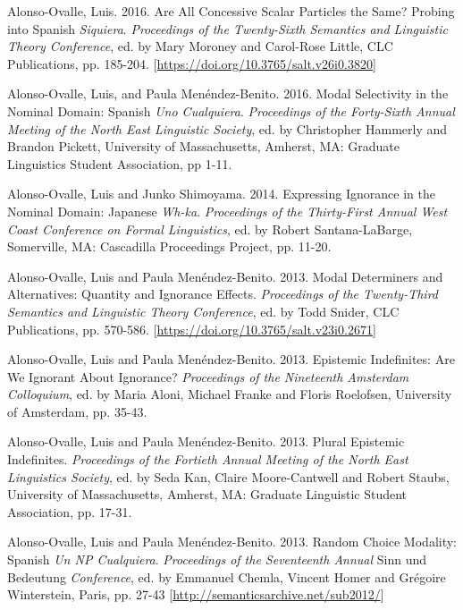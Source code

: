 \documentclass[11pt]{article}
\begin{document}
Alonso-Ovalle, Luis. 2016. Are All Concessive Scalar Particles the Same? Probing into Spanish \textit{Siquiera}.  \textit{Proceedings of the Twenty-Sixth
  Semantics and Linguistic Theory Conference}, ed. by Mary Moroney and
Carol-Rose Little, CLC Publications, pp. 185-204. {\footnotesize [\href{https://doi.org/10.3765/salt.v26i0.3820}{https://doi.org/10.3765/salt.v26i0.3820}]}

Alonso-Ovalle, Luis, and Paula Men\'endez-Benito. 2016. Modal Selectivity
in the Nominal Domain: Spanish \textit{Uno Cualquiera}. \textit{Proceedings
of the Forty-Sixth Annual Meeting of the North East Linguistic Society},
ed. by Christopher Hammerly and Brandon Pickett, University of Massachusetts, Amherst, MA: Graduate Linguistics Student Association, pp 1-11.

Alonso-Ovalle, Luis and Junko Shimoyama. 2014. Expressing Ignorance
in the Nominal Domain: Japanese \textit{Wh-ka}. \textit{Proceedings of
  the Thirty-First Annual West Coast Conference on Formal Linguistics}, ed. by Robert
Santana-LaBarge, Somerville, MA: Cascadilla Proceedings Project, pp. 11-20.

Alonso-Ovalle, Luis and Paula
Men\'endez-Benito. 2013. Modal Determiners and Alternatives:
Quantity and Ignorance Effects.  \textit{Proceedings of the Twenty-Third
  Semantics and Linguistic Theory Conference}, ed. by Todd Snider, CLC
Publications, pp. 570-586. {\footnotesize [\href{https://doi.org/10.3765/salt.v23i0.2671}{https://doi.org/10.3765/salt.v23i0.2671}]}

Alonso-Ovalle, Luis and Paula
Men\'endez-Benito. 2013. Epistemic Indefinites: Are We Ignorant About
Ignorance? \textit{Proceedings of the Nineteenth Amsterdam Colloquium},
ed. by Maria Aloni, Michael Franke and Floris Roelofsen, University of
Amsterdam, pp. 35-43.

Alonso-Ovalle, Luis and Paula
Men\'endez-Benito. 2013. Plural Epistemic
  Indefinites.  \textit{Proceedings of the Fortieth Annual Meeting of the North East Linguistics
    Society}, ed. by Seda Kan, Claire Moore-Cantwell and Robert
  Staubs, University of Massachusetts, Amherst, MA: Graduate Linguistic Student Association, pp. 17-31.

Alonso-Ovalle, Luis and Paula Men\'endez-Benito. 2013. Random
Choice Modality: Spanish \textit{Un {\em NP}
  Cualquiera}. \textit{Proceedings of the Seventeenth Annual} Sinn und Bedeutung \textit{Conference}, ed. by
Emmanuel Chemla, Vincent Homer and Gr\'egoire Winterstein, Paris, pp. 27-43 {\footnotesize [\href{http://semanticsarchive.net/sub2012/}{http://semanticsarchive.net/sub2012/}]}
\end{document}
